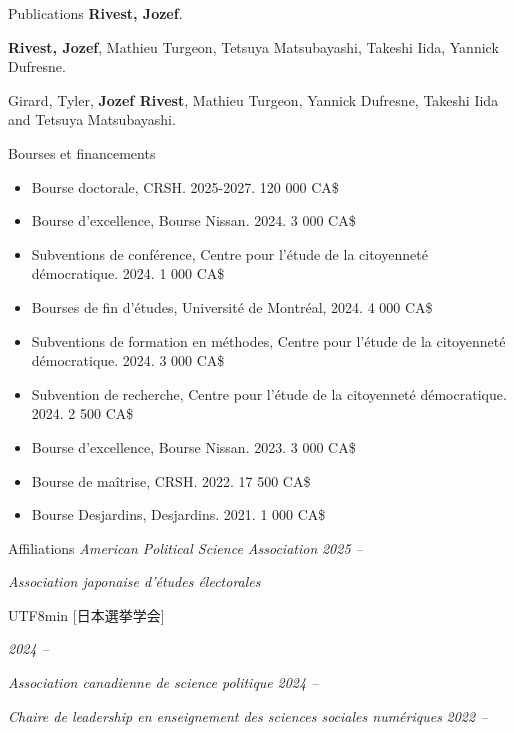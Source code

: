 \documentclass{resume} %
\begin{document}
\begin{rSection}{Publications}
{\textbf{Rivest, Jozef}. }

{\textbf{Rivest, Jozef}, Mathieu Turgeon, Tetsuya Matsubayashi, Takeshi Iida, Yannick Dufresne. }

{Girard, Tyler, \textbf{Jozef Rivest}, Mathieu Turgeon, Yannick Dufresne, Takeshi Iida and Tetsuya Matsubayashi. } \par 

\end{rSection}

\begin{rSection}{Bourses et financements}
\begin{itemize} 
  \item Bourse doctorale, CRSH. 2025-2027. 120 000 CA\$
  \item Bourse d'excellence, Bourse Nissan. 2024. 3 000 CA\$
  \item Subventions de conférence, Centre pour l'étude de la citoyenneté démocratique. 2024. 1 000 CA\$
  \item Bourses de fin d'études, Université de Montréal, 2024. 4 000 CA\$
  \item Subventions de formation en méthodes, Centre pour l'étude de la citoyenneté démocratique. 2024. 3 000 CA\$
  \item Subvention de recherche, Centre pour l'étude de la citoyenneté démocratique. 2024. 2 500 CA\$
  \item Bourse d'excellence, Bourse Nissan. 2023. 3 000 CA\$
  \item Bourse de maîtrise, CRSH. 2022. 17 500 CA\$
  \item Bourse Desjardins, Desjardins. 2021. 1 000 CA\$
\end{itemize}

\end{rSection}


\begin{rSection}{Affiliations} 
{\em American Political Science Association} \hfill{\em 2025 --} \par
{\em Association japonaise d'études électorales}\begin{CJK}{UTF8}{min} [日本選挙学会]\end{CJK} \hfill{\em 2024 -- } \par
{\em Association canadienne de science politique} \hfill{\em 2024 -- } \par
{\em Chaire de leadership en enseignement des sciences sociales numériques} \hfill{\em 2022 -- }
\end{rSection}
\end{document}
